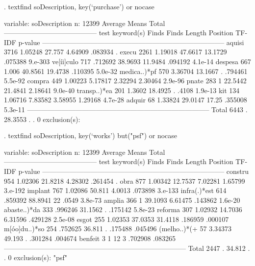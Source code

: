 . textfind soDescription, key(`purchase') or nocase

                               {}                               
variable:   soDescription
n: 12399                                     Average                       Means
                    Total   -----------------------------------------       test
keyword(s)          Finds      Finds     Length   Position     TF-IDF    p-value
--------------------------------------------------------------------------------
aquisi               3716    1.05248     27.757    4.64909    .083934          .
execu                2261    1.19018    47.6617    13.1729    .075388    9.e-303
ve[\'ii]culo            717    .712692    38.9693    11.9484    .094192    4.1e-14
despesa               667      1.006    40.8561    19.4738    .110395    5.0e-32
medica..)*p{\tytilde}f         570    3.36704    13.1667          .    .794461    5.5e-92
compra                449    1.00223    5.17817    2.32294    2.30464    2.9e-96
pnate                 283          1    22.5442    21.4841    2.18641    9.0e-40
transp..)*e{\tytilde}a         201     1.3602    18.4925          .      .4108    1.9e-13
kit                   134    1.06716    7.83582    3.58955    1.29168    4.7e-28
adquir                 68    1.33824    29.0147      17.25    .355008    5.3e-11
--------------------------------------------------------------------------------
Total                6443          .    28.3553          .          .          0
exclusion(s):

. textfind soDescription, key(`works') but("psf") or nocase

                               {}                               
variable:   soDescription
n: 12399                                     Average                       Means
                    Total   -----------------------------------------       test
keyword(s)          Finds      Finds     Length   Position     TF-IDF    p-value
--------------------------------------------------------------------------------
constru               954    1.02306    21.8218    4.28302    .261454          .
obra                  877    1.00342    12.7537    7.02281    1.65799    3.e-192
implant               767    1.02086     50.811     4.0013    .073898    3.e-133
infra(.)*es{\tytilde}t         614    .859392    88.8941         22      .0549    3.8e-73
amplia                366          1    39.1093    6.61475    .143862    1.6e-20
abaste..)*d{\tytilde}a         333    .996246    31.1562          .    .175142    5.8e-23
reforma               307    1.02932    14.7036    6.31596    .429128    2.5e-08
esgot                 255    1.02353    37.0353    31.4118    .186959    .000107
m[\'oo]du..)*s{\tytilde}o        254    .752625     36.811          .    .175488    .045496
(melho..)*({\tytilde}+          57    3.34373     49.193          .    .301284    .004674
benfeit                 3          1         12          3    .702908    .083265
--------------------------------------------------------------------------------
Total                2447          .     34.812          .          .          0
exclusion(s):
"psf"
